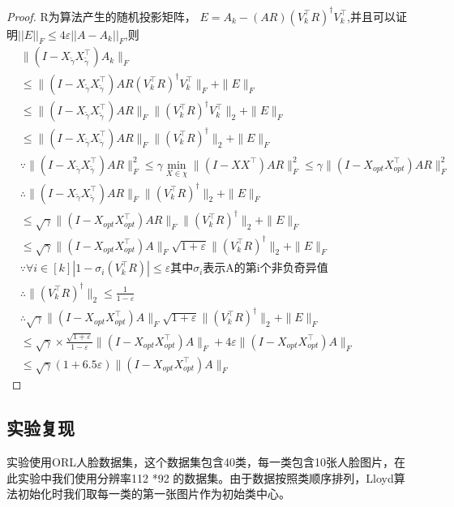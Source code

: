 \documentclass{ctexart}
\begin{document}
\begin{proof}
    R为算法产生的随机投影矩阵，
    $E = A_{k} - (AR)(V_{k}^{\top}R)^{\dagger}V_{k}^{\top}$,并且可以证明$\left | \left |E\right | \right | _{F} \le 4\varepsilon\left | \left |A - A_{k}\right | \right | _{F}$,则
    \begin{align*}
    &\|(I - X_{\tilde{\gamma}}X_{\tilde{\gamma}}^{\top})A_{k}\|_{F}\\
    &    \le \|(I - X_{\tilde{\gamma}}X_{\tilde{\gamma}}^{\top})AR(V_{k}^{\top}R)^{\dagger}V_{k}^{\top}\|_{F} + \|E\|_{F}\\
    & \le \|(I - X_{\tilde{\gamma}}X_{\tilde{\gamma}}^{\top})AR\|_{F}\|(V_{k}^{\top}R)^{\dagger}V_{k}^{\top}\|_{2} + \|E\|_{F}\\
    &    \le \|(I - X_{\tilde{\gamma}}X_{\tilde{\gamma}}^{\top})AR\|_{F}\|(V_{k}^{\top}R)^{\dagger}\|_{2} + \|E\|_{F}\\
    &    \because \|(I - X_{\tilde{\gamma}}X_{\tilde{\gamma}}^{\top})AR\|_{F}^2 \le \gamma\mathop{\min}_{X \in \chi}
    \|(I - XX^{\top})AR\|_{F}^2 \le \gamma \|(I - X_{opt}X_{opt}^{\top})AR\|_{F}^2\\
    & \therefore  \|(I - X_{\tilde{\gamma}}X_{\tilde{\gamma}}^{\top})AR\|_{F}\|(V_{k}^{\top}R)^{\dagger}\|_{2} + \|E\|_{F}\\
    &\le \sqrt{\gamma}\|(I - X_{opt}X_{opt}^{\top})AR\|_{F}\|(V_{k}^{\top}R)^{\dagger}\|_{2} + \|E\|_{F}\\
    &\le \sqrt{\gamma}\|(I - X_{opt}X_{opt}^{\top})A\|_{F}\sqrt{1+\varepsilon}\|(V_{k}^{\top}R)^{\dagger}\|_{2} + \|E\|_{F}\\
    &\because \forall i \in [k] |1 - \sigma_{i}(V_{k}^{\top}R)| \le \varepsilon \text{其中} \sigma_{i} \text{表示A的第i个非负奇异值} \\
    &\therefore \|(V_{k}^{\top}R)^{\dagger}\|_{2} \le \frac{1}{1-\varepsilon}\\
    &\therefore \sqrt{\gamma}\|(I - X_{opt}X_{opt}^{\top})A\|_{F}\sqrt{1+\varepsilon}\|(V_{k}^{\top}R)^{\dagger}\|_{2} + \|E\|_{F}\\
    &\le \sqrt{\gamma} \times \frac{\sqrt{1+\varepsilon}}{1-\varepsilon}\|(I - X_{opt}X_{opt}^{\top})A\|_{F}
    + 4\varepsilon \|(I - X_{opt}X_{opt}^{\top})A\|_{F}\\
    &\le \sqrt{\gamma} (1+6.5\varepsilon)\|(I - X_{opt}X_{opt}^{\top})A\|_{F}
    \end{align*}
    \end{proof}

    \subsection{实验复现}
    实验使用ORL人脸数据集，这个数据集包含40类，每一类包含10张人脸图片，在此实验中我们使用分辨率112 *92 的数据集。由于数据按照类顺序排列，Lloyd算法初始化时我们取每一类的第一张图片作为初始类中心。\\
\end{document}
